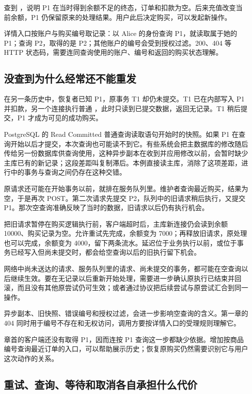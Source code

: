 查到 ，说明 P1 在当时得到余额不足的终态，订单和扣款为空。后来充值改变当前余额，P1 仍保留原来的处理结果。用户此后决定购买，可以发起新操作。

详情入口按账户与购买编号取记录：以 Alice 的身份查询 P1，就读取属于她的 P1；查询 P2，取得的是 P2；其他账户的编号会受到授权过滤。200、404 等 HTTP 状态码，需要连同查询使用的账户、编号和返回的购买状态理解。

\subsection*{没查到为什么经常还不能重发}

在另一条历史中，恢复者已知 P1，原事务 T1 却仍未提交。T1 已在内部写入 P1 并扣款，另一个连接执行普通 ，此时只读到已提交数据，返回无记录。T1 稍后提交，P1 才成为可见的成功购买。

PostgreSQL 的 Read Committed 普通查询读取语句开始时的快照。如果 P1 在查询开始以后才提交，本次查询也可能读不到它\cite{pg}。有些系统会把主数据库的修改随后传给另一份数据库供查询使用，这种异步副本在收到并应用修改以前，会暂时缺少主库已有的新记录；这段差距叫复制滞后。本例直接读主库，消除了这项差距，进行中的事务与查询之间仍存在这种交错。

原请求还可能在开始事务以前，就排在服务队列里。维护者查询最近购买，结果为空，于是再次 POST。第二次请求先提交 P2，队列中的旧请求稍后执行，又提交 P1。那次空查询准确反映了当时的数据，旧请求以后仍有执行机会。



把旧请求暂停在购买逻辑执行前，客户端超时后，主库新连接仍会读到余额 10000、购买记录为空。允许重试先完成，余额变为 7000；再释放旧请求，原处理也可以完成，余额变为 4000，留下两条流水。延迟位于业务执行以前，或位于事务已经写入但尚未提交时，都会给空查询以后的旧执行留下机会。

网络中尚未送达的请求、服务队列里的请求、尚未提交的事务，都可能在空查询以后继续生效。要在无记录以后重新开始处理，需要进一步确认原执行已结束并回滚，而且没有其他原尝试仍可生效；或者通过协议把后续尝试与原尝试汇合到同一操作。

异步副本、旧快照、错误编号和授权过滤，会进一步影响空查询的含义。第一章的 404 同时用于编号不存在和无权访问，调用方要按详情入口的受理规则理解它。

章首的客户端还没有取得 P1，因而连按 P1 查询这一步都缺少依据。增加按商品编号查询最近订单的入口，可以帮助展示历史；恢复原购买仍然需要识别它与用户这次动作的关系。

\subsection*{重试、查询、等待和取消各自承担什么代价}

